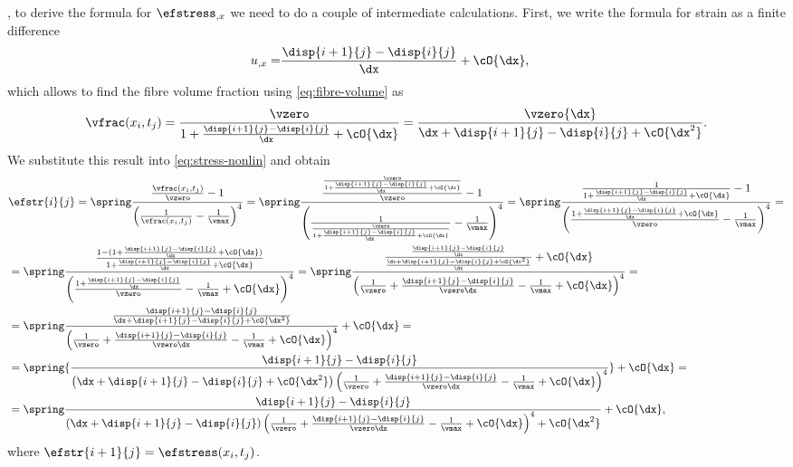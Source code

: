 \documentclass[twoside,a4paper,12pt,draft]{article}
\begin{document}
, to derive the
formula for $ \efstress_{,x}$ we need to do a couple of intermediate
calculations.  First, we write the formula for strain as a finite
difference
%
\begin{align}
  u_{,x} =& \frac{\disp{i+1}{j} - \disp{i}{j}}{\dx} + \cO{\dx},
\end{align}
%
which allows to find the fibre volume fraction using
\eqref{eq:fibre-volume} as
%
\begin{align}
  \vfrac(x_i,t_j) = \frac{\vzero}{1+\frac{\disp{i+1}{j} - \disp{i}{j}}{\dx} + \cO{\dx}}
  = \frac{\vzero{\dx}}{{\dx + \disp{i+1}{j} - \disp{i}{j} + \cO{\dx^2}}}
  \label{eq:vfrac-findiff}.
\end{align}
%
We substitute this result into \eqref{eq:stress-nonlin} and obtain
%
\begin{align}
  &\efstr{i}{j} = \spring
  \frac{\frac{\vfrac(x_i,t_j)}{\vzero} -1}{\left(\frac{1}{\vfrac(x_i,t_j)} -\frac{1}{\vmax}\right)^4} = \spring
  \frac{\frac{\frac{\vzero}{1+\frac{\disp{i+1}{j} - \disp{i}{j}}{\dx} + \cO{\dx}}}{\vzero} -1}{\left(\frac{1}{\frac{\vzero}{1+\frac{\disp{i+1}{j} - \disp{i}{j}}{\dx} + \cO{\dx}}} -\frac{1}{\vmax}\right)^4} = \spring
  \frac{{\frac{1}{1+\frac{\disp{i+1}{j} - \disp{i}{j}}{\dx} + \cO{\dx}}} -1}{\left({\frac{1+\frac{\disp{i+1}{j} - \disp{i}{j}}{\dx} + \cO{\dx}}{\vzero}} -\frac{1}{\vmax}\right)^4} = \nonumber \\
  &= \spring\frac{\frac{1 -(1+\frac{\disp{i+1}{j} - \disp{i}{j}}{\dx} + \cO{\dx})}{1+\frac{\disp{i+1}{j} - \disp{i}{j}}{\dx} + \cO{\dx}}}{\left({\frac{1+\frac{\disp{i+1}{j} - \disp{i}{j}}{\dx}}{\vzero}} -\frac{1}{\vmax}  + \cO{\dx}\right)^4}
    = \spring\frac{\frac{\frac{\disp{i+1}{j} - \disp{i}{j}}{\dx}}{\frac{\dx + \disp{i+1}{j} - \disp{i}{j} + \cO{\dx^2}}{\dx}} + \cO{\dx}}{\left(\frac{1}{\vzero} + \frac{\disp{i+1}{j} - \disp{i}{j}}{\vzero\dx} -\frac{1}{\vmax}  + \cO{\dx}\right)^4}= \nonumber \\
  &= \spring \frac{\frac{\disp{i+1}{j} - \disp{i}{j}}{\dx + \disp{i+1}{j} - \disp{i}{j} + \cO{\dx^2}}}%
    {\left(\frac{1}{\vzero} + \frac{\disp{i+1}{j} - \disp{i}{j}}{\vzero\dx} -\frac{1}{\vmax}  + \cO{\dx}\right)^4} + \cO{\dx} = \nonumber \\
  &= \spring {\frac{\disp{i+1}{j} - \disp{i}{j}}{\left(\dx + \disp{i+1}{j} - \disp{i}{j} + \cO{\dx^2}\right){\left(\frac{1}{\vzero} + \frac{\disp{i+1}{j} - \disp{i}{j}}{\vzero\dx} -\frac{1}{\vmax}  + \cO{\dx}\right)^4}}}%
    + \cO{\dx} =  \nonumber \\
  &= \spring \frac{\disp{i+1}{j} - \disp{i}{j}}{\left(\dx + \disp{i+1}{j} - \disp{i}{j}\right){\left(\frac{1}{\vzero} + \frac{\disp{i+1}{j} - \disp{i}{j}}{\vzero\dx} -\frac{1}{\vmax}  + \cO{\dx}\right)^4} + \cO{\dx^2}}
    + \cO{\dx}
  , \label{eq:stress-nonlin-findif}
\end{align}
where $\efstr{i+1}{j} = \efstress(x_i,t_j)$.
\end{document}
